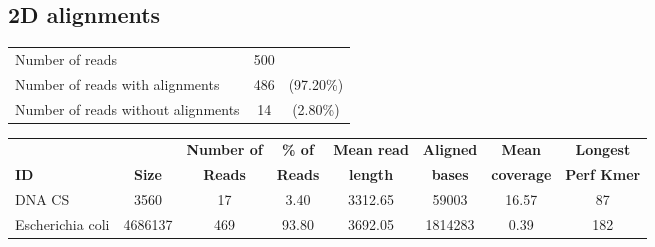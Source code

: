 \documentclass[a4paper,11pt,oneside]{article}
\begin{document}
\subsection*{2D alignments}
\vspace{-3mm}
\begin{table}[H]
{\footnotesize
\fontsize{9pt}{11pt}\selectfont
\begin{tabular}{l c c}
Number of reads & 500 & \\
Number of reads with alignments & 486 & (97.20\%) \\
Number of reads without alignments & 14 & (2.80\%) \\
\end{tabular}
}
\end{table}
\vspace{-10mm}
\begin{table}[H]
{\footnotesize
\fontsize{9pt}{11pt}\selectfont
\begin{tabular}{l c c c c c c c}
          &             & {\bf Number of} & {\bf \% of} & {\bf Mean read} & {\bf Aligned} & {\bf Mean} & {\bf Longest} \\
{\bf ID} & {\bf Size} & {\bf Reads}     & {\bf Reads}  & {\bf length}    & {\bf bases}   & {\bf coverage} & {\bf Perf Kmer} \\
DNA CS & 3560 & 17 & 3.40 & 3312.65 & 59003 & 16.57 & 87 \\
Escherichia coli & 4686137 & 469 & 93.80 & 3692.05 & 1814283 & 0.39 & 182 \\
\end{tabular}
}
\end{table}
\clearpage
\end{document}
